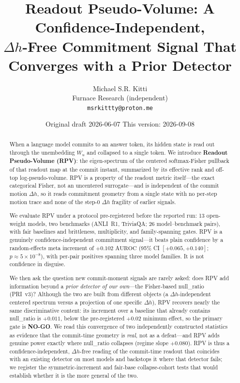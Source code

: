 \documentclass[10pt, letterpaper]{article}
\title{Readout Pseudo-Volume: A Confidence-Independent,\\
$\Delta h$-Free Commitment Signal That Converges with a Prior Detector}
\author{Michael S.R. Kitti \\ Furnace Research (independent) \\ \texttt{msrkittty@proton.me}}
\date{Original draft 2026-06-07 \quad This version: 2026-09-08}
\newcommand{\auroc}{\text{AUROC}}
\newcommand{\Wu}{W_{u}}
\newcommand{\nullr}{\textsf{null\_ratio}}
\begin{document}
\maketitle

\begin{abstract}
When a language model commits to an answer token, its hidden state is
read out through the unembedding $\Wu$ and collapsed to a single token.
We introduce \textbf{Readout Pseudo-Volume (RPV)}: the eigen-spectrum
of the centered softmax-Fisher pullback of that readout map at the
commit instant, summarized by its effective rank and off-top
log-pseudo-volume. RPV is a property of the readout metric itself---the
exact categorical Fisher, not an uncentered surrogate---and is
independent of the commit motion $\Delta h$, so it reads commitment
geometry from a single state with no per-step motion trace and none of
the step-0 $\Delta h$ fragility of earlier signals.

We evaluate RPV under a protocol pre-registered before the reported run:
13 open-weight models, two benchmarks (ANLI~R1, TriviaQA; 26
model--benchmark pairs), with fair baselines and brittleness,
multiplicity, and family-spanning gates. RPV is a genuinely
confidence-independent commitment signal---it beats plain confidence by
a random-effects meta increment of $+0.102$ $\auroc$ (95\% CI
$[+0.065,+0.140]$; $p\approx 5\times10^{-8}$), with per-pair positives
spanning three model families. It is not confidence in disguise.

We then ask the question new commit-moment signals are rarely asked:
does RPV add information beyond a \emph{prior detector of our own}---the
Fisher-based \nullr{} (PRI~v3)? Although the two are built from
different objects (a $\Delta h$-independent centered spectrum versus a
projection of one specific $\Delta h$), RPV recovers nearly the same
discriminative content: its increment over a baseline that already
contains \nullr{} is $+0.011$, below the pre-registered $+0.02$ minimum
effect, so the primary gate is \textbf{NO-GO}. We read this convergence
of two independently constructed statistics as evidence that the
commit-time geometry is \emph{real}, not as a defeat---and RPV adds
genuine power exactly where \nullr{} collapses (regime slope $+0.080$).
RPV is thus a confidence-independent, $\Delta h$-free reading of the
commit-time readout that coincides with an existing detector on most
models and backstops it where that detector fails; we register the
symmetric-increment and fair-base collapse-cohort tests that would
establish whether it is the more general of the two.
\end{abstract}
\end{document}
